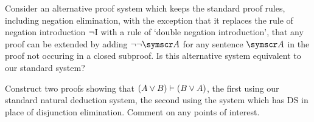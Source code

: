 \practiceproblems
\problempart Consider an alternative proof system which keeps the standard proof rules, including negation elimination, with the exception that it replaces the rule of negation introduction $\neg$I with a rule of `double negation introduction', that any proof can be extended by adding $\enot\enot\meta{A}$ for any sentence $\meta{A}$ in the proof not occuring in a closed subproof. Is this alternative system equivalent to our standard system? 

\problempart Construct two proofs showing that $(A\vee B)\vdash (B \vee A)$, the first using our standard natural deduction system, the second using the system which has DS in place of disjunction elimination. Comment on any points of interest.









